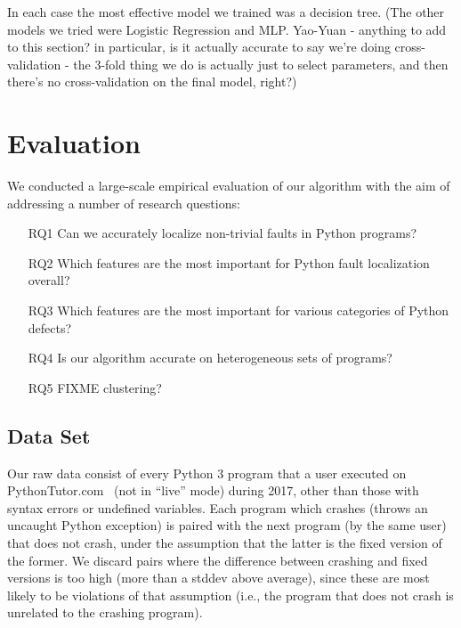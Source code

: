 \documentclass[conference]{IEEEtran}
\begin{document}
In each case the most effective model we trained was a decision tree. (The other
models we tried were Logistic Regression and MLP. Yao-Yuan - anything to add to
this section? in particular, is it actually accurate to say we're doing
cross-validation - the 3-fold thing we do is actually just to select parameters,
and then there's no cross-validation on the final model, right?)

\section{Evaluation}
\label{sec-eval}

We conducted a large-scale empirical evaluation of our algorithm with the
aim of addressing a number of research questions:
\begin{enumerate}

\item[RQ1]{Can we accurately localize non-trivial faults in Python
programs?}

\item[RQ2]{Which features are the most important for Python fault
localization overall?}

\item[RQ3]{Which features are the most important for various categories of
Python defects?}

\item[RQ4]{Is our algorithm accurate on heterogeneous sets of programs?}

\item[RQ5]{FIXME clustering?}

\end{enumerate}

\subsection{Data Set}

Our raw data consist of every Python 3 program that a user executed on
PythonTutor.com~\cite{Guo2013-vu} (not in ``live'' mode) during 2017, other
than those with syntax errors or undefined variables.  Each program which
crashes (throws an uncaught Python exception) is paired with the next
program (by the same user) that does not crash, under the assumption that
the latter is the fixed version of the former. We discard pairs where the
difference between crashing and fixed versions is too high (more than a
stddev above average), since these are most likely to be violations of that
assumption (i.e., the program that does not crash is unrelated to the
crashing program).
\end{document}
